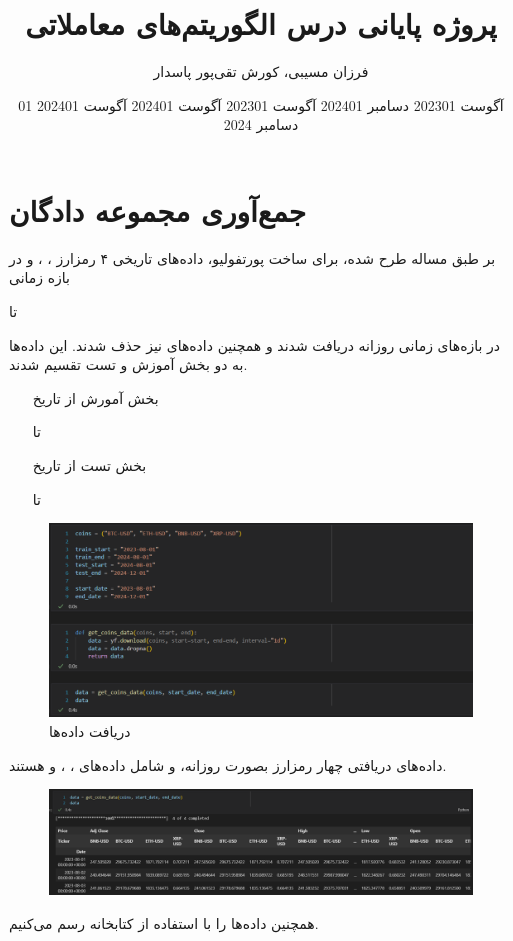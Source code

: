\documentclass[12pt]{article}
\title{پروژه پایانی درس الگوریتم‌های معاملاتی}
\author{فرزان مسیبی، کورش تقی‌پور پاسدار}
\begin{document}
	\maketitle
	\newpage
	\tableofcontents
	\newpage
	\section{جمع‌آوری مجموعه دادگان}
	بر طبق مساله طرح شده، برای ساخت پورتفولیو، داده‌های تاریخی ۴ رمزارز ، ،  و  در بازه زمانی \date{01 آگوست 2023} تا \date{01 دسامبر 2024} در بازه‌های زمانی روزانه دریافت شدند و همچنین داده‌های  نیز حذف شدند. این داده‌ها به دو بخش آموزش و تست تقسیم شدند.
	\begin{itemize}
		\item[بخش آمورش] از تاریخ \date{01 آگوست 2023} تا \date{01 آگوست 2024}
		\item[بخش تست] از تاریخ \date{01 آگوست 2024} تا \date{01 دسامبر 2024}
	\end{itemize}
	\begin{figure}[h!]
		\centering
		\includegraphics[width=0.9\linewidth]{pic_1}
		\caption{دریافت داده‌ها}
	\end{figure}
	داده‌های دریافتی چهار رمزارز بصورت روزانه، و شامل داده‌های ، ،  و  هستند.
	\begin{figure}[H]
		\centering
		\includegraphics[width=0.9\linewidth]{pic_2}
	\end{figure}
	همچنین داده‌ها را با استفاده از کتابخانه  رسم می‌کنیم.
\end{document}
